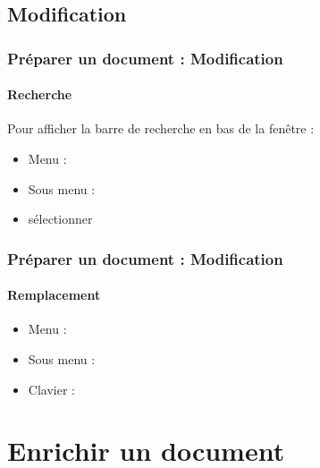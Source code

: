 \documentclass[xcolor=table]{beamer}
\begin{document}
\subsection{Modification}%

\begin{frame}[t]
\frametitle{Préparer un document : Modification}
\framesubtitle{Recherche}

	Pour afficher la barre de recherche en bas de la fenêtre :
	\begin{itemize}
		\item Menu : 
		\item Sous menu : 
		\item sélectionner 
	\end{itemize}
%	


\end{frame}

\begin{frame}[t]
\frametitle{Préparer un document : Modification}
\framesubtitle{Remplacement}

\begin{minipage}{0.38\textwidth}
	\begin{itemize}
		\item Menu : 
		\item Sous menu : 
		\item Clavier : 
	\end{itemize}
\end{minipage}
\begin{minipage}{0.6\textwidth}	
\end{minipage}

\end{frame}

\section{Enrichir un document}
\end{document}
